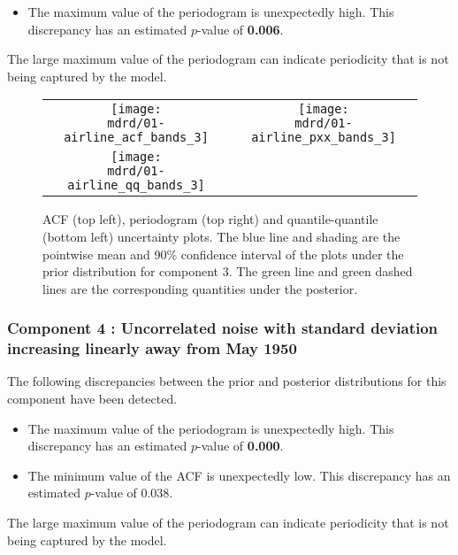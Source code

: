 \documentclass{article} %
\begin{document}
\begin{itemize}

    \item The maximum value of the periodogram is unexpectedly high. This discrepancy has an estimated $p$-value of \textbf{0.006}.
\end{itemize}

The large maximum value of the periodogram can indicate periodicity that is not being captured by the model.


\begin{figure}[H]
\newcommand{\wmgd}{0.5\columnwidth}
\newcommand{\hmgd}{3.0cm}
\newcommand{\mdrd}{01-airline}
\newcommand{\mbm}{\hspace{-0.3cm}}
\begin{tabular}{cc}
\mbm \texttt{[image: \\mdrd/01-airline\_acf\_bands\_3]} & \texttt{[image: \\mdrd/01-airline\_pxx\_bands\_3]} \\
\mbm \texttt{[image: \\mdrd/01-airline\_qq\_bands\_3]}
\end{tabular}
\caption{
ACF (top left), periodogram (top right) and quantile-quantile (bottom left) uncertainty plots.
The blue line and shading are the pointwise mean and 90\% confidence interval of the plots under the prior distribution for component 3.
The green line and green dashed lines are the corresponding quantities under the posterior.}
\label{fig:check3}
\end{figure}

\subsubsection{Component 4 : Uncorrelated noise with standard deviation increasing linearly away from May 1950}


The following discrepancies between the prior and posterior distributions for this component have been detected.

\begin{itemize}

    \item The maximum value of the periodogram is unexpectedly high. This discrepancy has an estimated $p$-value of \textbf{0.000}.
    \item The minimum value of the ACF is unexpectedly low. This discrepancy has an estimated $p$-value of 0.038.
\end{itemize}

The large maximum value of the periodogram can indicate periodicity that is not being captured by the model.
\end{document}

